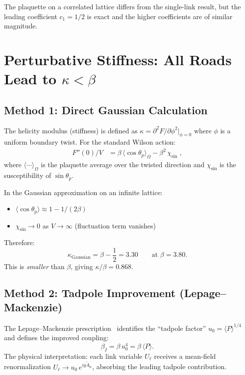 \documentclass[11pt]{article}
\begin{document}
The plaquette on a correlated lattice differs from the single-link result,
but the leading coefficient $c_1 = 1/2$ is exact and the higher coefficients
are of similar magnitude.


\section{Perturbative Stiffness: All Roads Lead to $\kappa < \beta$}

\subsection{Method 1: Direct Gaussian Calculation}

The helicity modulus (stiffness) is defined as
$\kappa = \partial^2 F/\partial\phi^2\big|_{\phi=0}$
where $\phi$ is a uniform boundary twist.  For the standard Wilson action:
\begin{align}
  F''(0)/V &= \beta\,\langle\cos\theta_p\rangle_{\Omega}
  - \beta^2\,\chi_{\sin}\;, \label{eq:helmod}
\end{align}
where $\langle\cdots\rangle_\Omega$ is the plaquette average over the
twisted direction and $\chi_{\sin}$ is the susceptibility of $\sin\theta_p$.

In the Gaussian approximation on an infinite lattice:
\begin{itemize}
  \item $\langle\cos\theta_p\rangle \approx 1 - 1/(2\beta)$
  \item $\chi_{\sin} \to 0$ as $V \to \infty$ (fluctuation term vanishes)
\end{itemize}
Therefore:
\begin{equation}\label{eq:kappa_gauss}
  \boxed{\kappa_{\text{Gaussian}} = \beta - \frac{1}{2} = 3.30}
  \qquad\text{at }\beta = 3.80.
\end{equation}
This is \emph{smaller} than $\beta$, giving $\kappa/\beta = 0.868$.

\subsection{Method 2: Tadpole Improvement (Lepage--Mackenzie)}

The Lepage--Mackenzie prescription~\cite{LepageMackenzie1993} identifies
the ``tadpole factor'' $u_0 = \langle P\rangle^{1/4}$ and defines the
improved coupling:
\begin{equation}
  \beta_I = \beta\,u_0^4 = \beta\,\langle P\rangle.
\end{equation}
The physical interpretation: each link variable $U_\ell$ receives a
mean-field renormalization $U_\ell \to u_0\,e^{ig\widetilde{A}_\mu}$,
absorbing the leading tadpole contribution.
\end{document}
